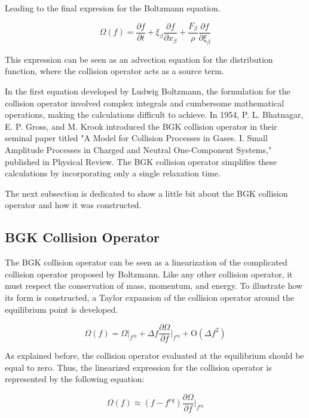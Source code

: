 Leading to the final expresion for the Boltzmann equation.

\begin{equation}
	\Omega(f) = \frac{\partial f}{\partial t} 
	+ \xi_{\beta}\frac{\partial f}{\partial x_{\beta}}
	+ \frac{F_{\beta}}{\rho}\frac{\partial f}{\partial \xi_{\beta}}
\end{equation}

This expression can be seen as an advection equation for the distribution 
function, where the collision operator acts as a source term.

In the first equation developed by Ludwig Boltzmann, the formulation for
the collision operator involved complex integrals and cumbersome mathematical 
operations, making the calculations difficult to achieve. In 1954, 
P. L. Bhatnagar, E. P. Gross, and M. Krook introduced the BGK collision 
operator in their seminal paper titled "A Model for Collision Processes 
in Gases. I. Small Amplitude Processes in Charged and Neutral One-Component 
Systems," published in Physical Review. The BGK collision operator 
simplifies these calculations by incorporating only a single relaxation time.

The next subsection is dedicated to show a little bit about the BGK collision 
operator and how it was constructed.

\subsection{BGK Collision Operator}

The BGK collision operator can be seen as a linearization of the complicated 
collision operator proposed by Boltzmann. Like any other collision operator, 
it must respect the conservation of mass, momentum, and energy. 
To illustrate how its form is constructed, a Taylor expansion of the 
collision operator around the equilibrium point is developed.

\begin{equation}
	\Omega(f) = \Omega|_{f^{eq}} 
	+ \Delta f \frac{\partial \Omega}{\partial f} \bigg|_{f^{eq}} 
	+ \mathrm{O}(\Delta f^2)
\end{equation}

As explained before, the collision operator evaluated at the equilibrium 
should be equal to zero. Thus, the linearized expression for the collision 
operator is represented by the following equation:

\begin{equation}
	\Omega(f) \approx 
	(f - f^{eq}) \frac{\partial \Omega}{\partial f} \bigg|_{f^{eq}} 
\end{equation}


